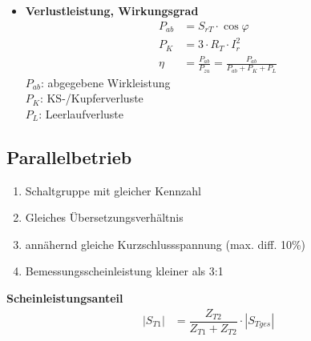 \begin{itemize}
    \item[]{\textbf{Verlustleistung, Wirkungsgrad}}
\begin{align*}
    P_{ab} &= S_{rT} \cdot \cos \varphi\\
    P_K &= 3 \cdot R_T \cdot I^2_r\\
    \eta &= \frac{P_{ab}}{P_{zu}} = \frac{P_{ab}}{P_{ab}+P_K+P_L}
\end{align*}
$P_{ab}$: abgegebene Wirkleistung\\
$P_K$: KS-/Kupferverluste\\
$P_L$: Leerlaufverluste

\end{itemize}

\subsection{Parallelbetrieb}
\begin{enumerate}
    \item Schaltgruppe mit gleicher Kennzahl
    \item Gleiches Übersetzungsverhältnis
    \item annähernd gleiche Kurzschlussspannung (max. diff. 10\%)
    \item Bemessungsscheinleistung kleiner als 3:1
\end{enumerate}

\textbf{Scheinleistungsanteil}
\begin{align*}
    |S_{T1}| &= \dfrac{Z_{T2}}{Z_{T1} + Z_{T2}} \cdot |S_{Tges}|
\end{align*}
